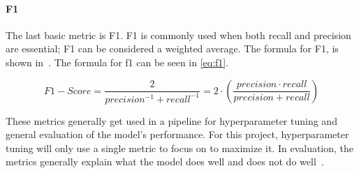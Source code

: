 \paragraph{F1} The last basic metric is F1. F1 is commonly used when both recall and precision are essential; F1 can be considered a weighted average. The formula for F1, is shown in~\cite{metrics-for-multi}. The formula for f1 can be seen in \autoref{eq:f1}.

\begin{equation}
    F1-Score = \frac{2}{precision^{-1} + recall^{-1}} = 2\cdot (\frac{precision \cdot recall}{precision + recall})\label{eq:f1}
\end{equation}

These metrics generally get used in a pipeline for hyperparameter tuning and general evaluation of the model's performance. For this project, hyperparameter tuning will only use a single metric to focus on to maximize it. In evaluation, the metrics generally explain what the model does well and does not do well~\cite{james-statistical-learning}.

